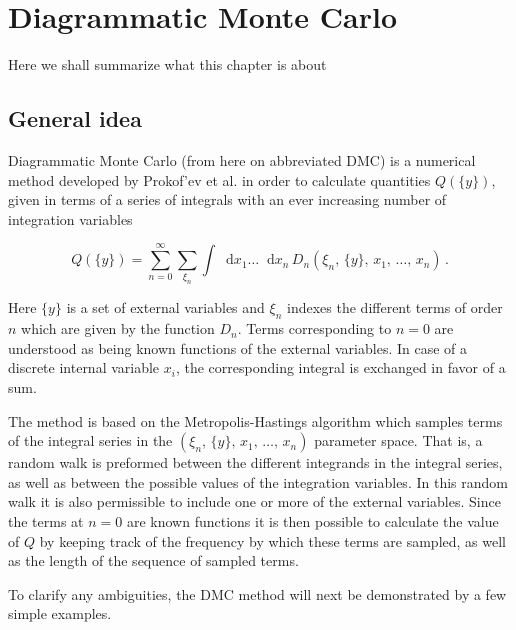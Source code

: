 \documentclass[12pt]{report}
\newcommand*\diff{\mathop{}\!\mathrm{d}}
\newcommand{\todo}[1]{{\leavevmode\color{todo}#1}}
\begin{document}
\chapter{Diagrammatic Monte Carlo}

\todo{Here we shall summarize what this chapter is about}

\section{General idea}

Diagrammatic Monte Carlo (from here on abbreviated DMC) is a numerical method developed by Prokof’ev et al. \cite{MishchenkoA.2000DqMC} in order to calculate quantities $ Q(\{ y \}) $, given in terms of a series of integrals with an ever increasing number of integration variables

\begin{equation}
	\label{eq:integralSeries}
	Q(\{ y \})
	= \sum_{n=0}^\infty \sum_{\xi_n} \int \diff x_1 \dots \diff x_n \, D_n(\xi_n, \, \{y\}, \, x_1, \, \dots , \, x_n) \,.
\end{equation}

Here $ \{y\} $ is a set of external variables and $ \xi_n $ indexes the different terms of order $ n $ which are given by the function $ D_n $. Terms corresponding to $ n = 0 $ are understood as being known functions of the external variables. In case of a discrete internal variable $ x_i $, the corresponding integral is exchanged in favor of a sum.

The method is based on the Metropolis-Hastings algorithm which samples terms of the integral series in the $ (\xi_n, \, \{y\}, \, x_1, \, \dots , \, x_n) $ parameter space. That is, a random walk is preformed between the different integrands in the integral series, as well as between the possible values of the integration variables. In this random walk it is also permissible to include one or more of the external variables. Since the terms at $ n = 0 $ are known functions it is then possible to calculate the value of $ Q $ by keeping track of the frequency by which these terms are sampled, as well as the length of the sequence of sampled terms.

To clarify any ambiguities, the DMC method will next be demonstrated by a few simple examples.


\end{document}
